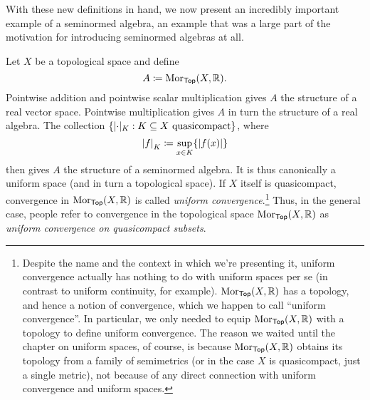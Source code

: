 With these new definitions in hand, we now present an incredibly important example of a seminormed algebra, an example that was a large part of the motivation for introducing seminormed algebras at all.
\begin{exm}\label{exm4.3.60}
Let $X$ be a topological space and define
\begin{equation}
A\coloneqq \operatorname{Mor} _{\mathsf{Top}}(X,\mathbb{R} ).
\end{equation}
Pointwise addition and pointwise scalar multiplication gives $A$ the structure of a real vector space.  Pointwise multiplication gives $A$ in turn the structure of a real algebra.  The collection $\{ \norm _K:K\subseteq X\text{ quasicompact}\}$, where
\begin{equation}
\norm[f]_K\coloneqq \sup _{x\in K}\{ \abs{f(x)}\} 
\end{equation}
then gives $A$ the structure of a seminormed algebra.  It is thus canonically a uniform space (and in turn a topological space).  If $X$ itself is quasicompact, convergence in $\operatorname{Mor} _{\mathsf{Top}}(X,\mathbb{R} )$ is called \emph{uniform convergence}.\footnote{Despite the name and the context in which we're presenting it, uniform convergence actually has nothing to do with uniform spaces per se (in contrast to uniform continuity, for example).  $\operatorname{Mor} _{\mathsf{Top}}(X,\mathbb{R} )$ has a topology, and hence a notion of convergence, which we happen to call ``uniform convergence''.  In particular, we only needed to equip $\operatorname{Mor} _{\mathsf{Top}}(X,\mathbb{R} )$ with a topology to define uniform convergence.  The reason we waited until the chapter on uniform spaces, of course, is because $\operatorname{Mor} _{\mathsf{Top}}(X,\mathbb{R} )$ obtains its topology from a family of semimetrics (or in the case $X$ is quasicompact, just a single metric), not because of any direct connection with uniform convergence and uniform spaces.}  Thus, in the general case, people refer to convergence in the topological space $\operatorname{Mor} _{\mathsf{Top}}(X,\mathbb{R} )$ as \emph{uniform convergence on quasicompact subsets}.


\end{exm}
